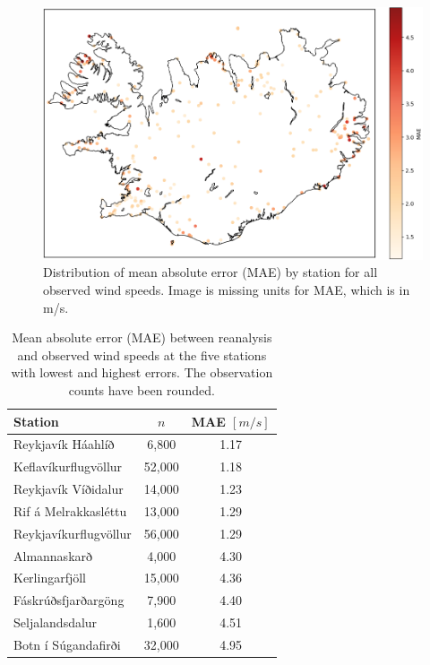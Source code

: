 \begin{figure}[h]
  \centering
  \includegraphics[scale=0.6]{Figures/MAEoverIceland.png}
  \caption[MAE distribution by station]{Distribution of mean absolute error (MAE) by station for all observed wind speeds. Image is missing units for MAE, which is in m/s.}
  \label{fig:station_mae_distribution}
\end{figure}

\begin{table}[h]
  \centering
  \caption[Station MAE extremes]{Mean absolute error (MAE) between reanalysis and observed wind speeds at the five stations with lowest and highest errors. The observation counts have been rounded.}
  \label{table:station_mae_distribution}
  \begin{tabular}{lcc}
    \toprule
    Station               & $n$     & MAE $[m/s]$ \\
    \midrule
    Reykjavík Háahlíð     & 6,800   & 1.17 \\
    Keflavíkurflugvöllur  & 52,000  & 1.18 \\
    Reykjavík Víðidalur   & 14,000  & 1.23 \\
    Rif á Melrakkasléttu  & 13,000  & 1.29 \\
    Reykjavíkurflugvöllur & 56,000  & 1.29 \\
    \midrule
    Almannaskarð          &  4,000  & 4.30 \\
    Kerlingarfjöll        & 15,000  & 4.36 \\
    Fáskrúðsfjarðargöng   &  7,900  & 4.40 \\
    Seljalandsdalur       &  1,600  & 4.51 \\
    Botn í Súgandafirði   & 32,000  & 4.95 \\
    \bottomrule
  \end{tabular}
\end{table}

